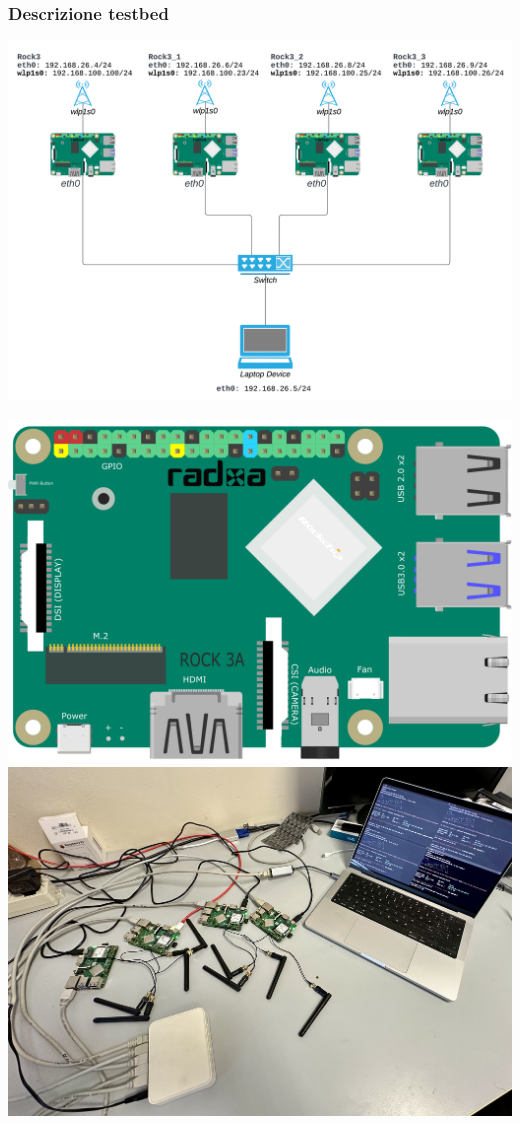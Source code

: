 \documentclass{beamer}
\begin{document}
\begin{frame}
    \frametitle{Descrizione testbed}
    \centering
    \begin{minipage}{0.58\textwidth}
        \includegraphics[width=\textwidth]{topology.png}
    \end{minipage}%
    \hfill
    \begin{minipage}{0.38\textwidth}
        \centering
        \includegraphics[width=\textwidth]{ROCK_3A.png}
        \vspace{0.5cm}
        \includegraphics[width=\textwidth]{topology_photo.jpg}

\end{minipage}
\end{frame}
\end{document}
